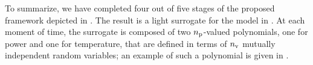 To summarize, we have completed four out of five stages of the proposed framework depicted in .
The result is a light surrogate for the model in .
At each moment of time, the surrogate is composed of two ${n_\text{p}}$-valued polynomials, one for power and one for temperature, that are defined in terms of ${n_\text{v}}$ mutually independent random variables; an example of such a polynomial is given in .
